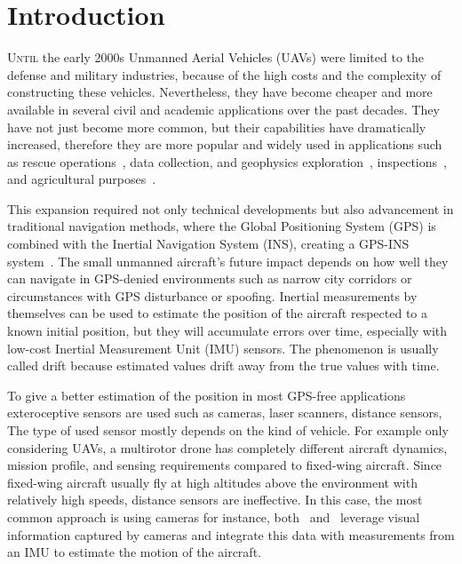 \chapter{Introduction}

\lettrine{U}{ntil} the early 2000s Unmanned Aerial Vehicles (UAVs) were limited to the defense and military industries, because of the high costs and the complexity of constructing these vehicles. Nevertheless, they have become cheaper and more available in several civil and academic applications over the past decades. They have not just become more common, but their capabilities have dramatically increased, therefore they are more popular and widely used in applications such as rescue operations~\cite{rescue-operations}, data collection, and geophysics exploration~\cite{data-collection}, inspections~\cite{inspection}, and agricultural purposes~\cite{agriculure}.

This expansion required not only technical developments but also advancement in traditional navigation methods, where the Global Positioning System (GPS) is combined with the Inertial Navigation System (INS), creating a GPS-INS system~\cite{gps-ins}. The small unmanned aircraft's future impact depends on how well they can navigate in GPS-denied environments such as narrow city corridors or circumstances with GPS disturbance or spoofing.  Inertial measurements by themselves can be used to estimate the position of the aircraft respected to a known initial position, but they will accumulate errors over time, especially with low-cost Inertial Measurement Unit (IMU) sensors. The phenomenon is usually called drift because estimated values drift away from the true values with time.

To give a better estimation of the position in most GPS-free applications exteroceptive sensors are used such as cameras, laser scanners, distance sensors, \etc{} The type of used sensor mostly depends on the kind of vehicle. For example only considering UAVs, a multirotor drone has completely different aircraft dynamics, mission profile, and sensing requirements compared to fixed-wing aircraft. Since fixed-wing aircraft usually fly at high altitudes above the environment with relatively high speeds, distance sensors are ineffective. In this case, the most common approach is using cameras for instance, both~\cite{gps-ins-cam} and~\cite{rel-nav} leverage visual information captured by cameras and integrate this data with measurements from an IMU to estimate the motion of the aircraft. 

